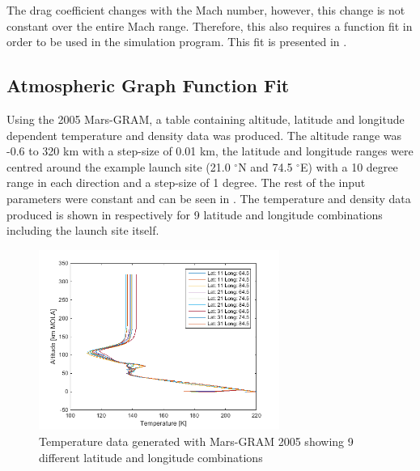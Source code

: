 \noindent
The drag coefficient changes with the Mach number, however, this change is not constant over the entire Mach range. Therefore, this also requires a function fit in order to be used in the simulation program. This fit is presented in .

\subsection{Atmospheric Graph Function Fit}
\label{subsec:atmofuncfit}
Using the 2005 Mars-\acf{GRAM}, a table containing altitude, latitude and longitude dependent temperature and density data was produced. The altitude range was -0.6 to 320 km  with a step-size of 0.01 km, the latitude and longitude ranges were centred around the example launch site (21.0 $^\circ$N and 74.5 $^\circ$E) with a 10 degree range in each direction and a step-size of 1 degree. The rest of the input parameters were constant and can be seen in . The temperature and density data produced is shown in  respectively for 9 latitude and longitude combinations including the launch site itself.                                                                                                                                                                                                                                                                                                                                                                                                                                                                                          


\begin{figure}[H]
\centering
\includegraphics[width=0.7\textwidth]{figures/software/temperatureData.png}
\caption{Temperature data generated with Mars-\ac{GRAM} 2005 showing 9 different latitude and longitude combinations}
\label{fig:temperatureData}
\end{figure}

